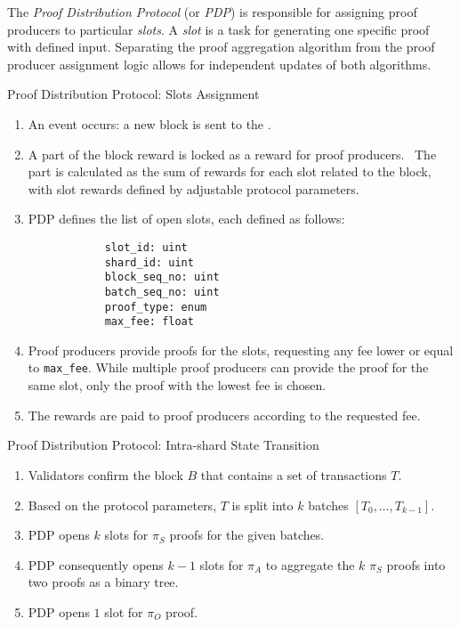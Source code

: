 The \textit{Proof Distribution Protocol} (or \textit{PDP}) 
 is responsible for assigning proof producers to particular \textit{slots}.
A \textit{slot} is a task for generating one specific proof with defined input.
Separating the proof aggregation algorithm from the proof producer assignment logic
 allows for independent updates of both algorithms.

\begin{algorithm}
    \caption{Proof Distribution Protocol: Slots Assignment}
\begin{enumerate}
    \item An event occurs: a new block is sent to the \mainshard. 
    \item A part of the block reward is locked as a reward for proof producers. \
    The part is calculated as the sum of rewards for each slot related to the block, 
     with slot rewards defined by adjustable protocol parameters.  
    \item PDP defines the list of open slots, each defined as follows:
        \begin{verbatim}
            slot_id: uint
            shard_id: uint
            block_seq_no: uint
            batch_seq_no: uint
            proof_type: enum
            max_fee: float
        \end{verbatim}
    \item Proof producers provide proofs for the slots, 
     requesting any fee lower or equal to \texttt{max\_fee}. 
     While multiple proof producers can provide the proof for the same slot, 
     only the proof with the lowest fee is chosen. 
    \item The rewards are paid to proof producers according to the requested fee. 
\end{enumerate}
\end{algorithm}

\begin{algorithm}
\caption{Proof Distribution Protocol: Intra-shard State Transition}
\label{algo:slot-processing}
\begin{enumerate}
    \item Validators confirm the block $B$ that contains a set of transactions $T$.
    \item Based on the protocol parameters, 
     $T$ is split into $k$ batches $[T_0, \ldots, T_{k - 1}]$. 
    \item \label{step:slot-processing:pi-s}
     PDP opens $k$ slots for $\pi_S$ proofs for the given batches.
    \item \label{step:slot-processing:pi-a} 
     PDP consequently opens $k - 1$ slots for $\pi_A$
     to aggregate the $k$ $\pi_S$ proofs into two proofs as a binary tree.
    \item PDP opens $1$ slot for $\pi_O$ proof.
\end{enumerate}
\end{algorithm}

